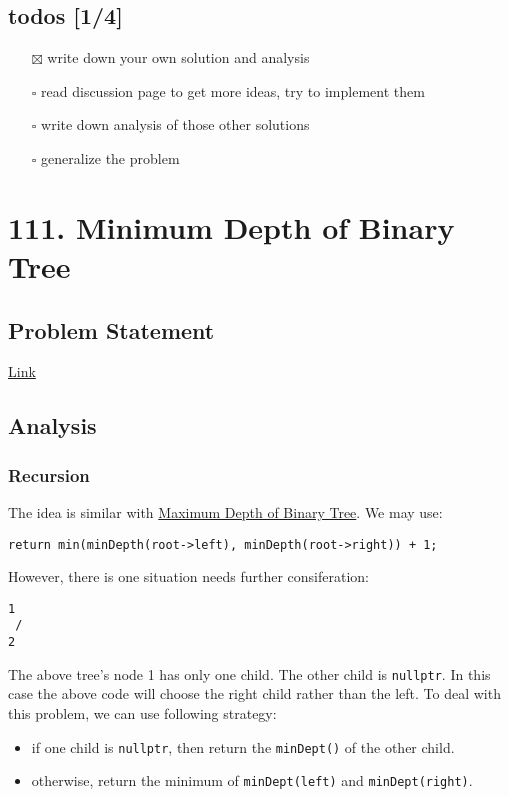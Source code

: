 \documentclass[11pt]{article}
\begin{document}
\subsection{todos [1/4]}
\label{sec:org0c2775e}
\begin{itemize}
\item[{$\boxtimes$}] write down your own solution and analysis
\item[{$\square$}] read discussion page to get more ideas, try to implement them
\item[{$\square$}] write down analysis of those other solutions
\item[{$\square$}] generalize the problem
\end{itemize}
\section{111. Minimum Depth of Binary Tree}
\label{sec:orgf6d9e24}
\subsection{Problem Statement}
\label{sec:orga161fd8}
\href{https://leetcode.com/problems/minimum-depth-of-binary-tree/}{Link}
\subsection{Analysis}
\label{sec:org27b4b4b}
\subsubsection{Recursion}
\label{sec:org292cbcd}
The idea is similar with \hyperref[org9605041]{Maximum Depth of Binary Tree}. We may use:
\begin{verbatim}
return min(minDepth(root->left), minDepth(root->right)) + 1;
\end{verbatim}

However, there is one situation needs further consiferation:
\begin{Verbatim}[frame=single]
  1
 /
2 
\end{Verbatim}
The above tree's node 1 has only one child. The other child is \texttt{nullptr}. In this case the above code will choose the right child rather than the left. To deal with this problem, we can use following strategy:
\begin{itemize}
\item if one child is \texttt{nullptr}, then return the \texttt{minDept()} of the other child.
\item otherwise, return the minimum of \texttt{minDept(left)} and \texttt{minDept(right)}.
\end{itemize}
\end{document}
